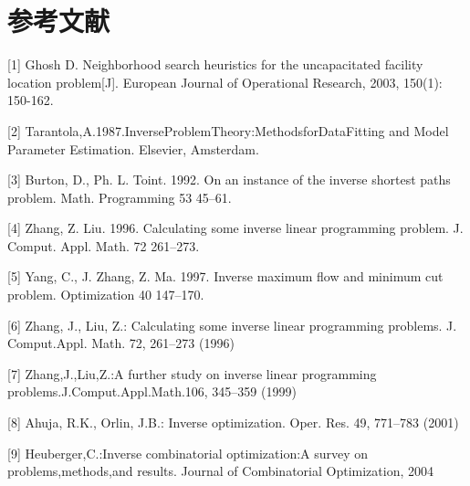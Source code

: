 \documentclass[UTF8]{article}
\begin{document}

\section*{参考文献}

[1] Ghosh D. Neighborhood search heuristics for the uncapacitated facility location problem[J]. European Journal of Operational Research, 2003, 150(1): 150-162.

[2] Tarantola,A.1987.InverseProblemTheory:MethodsforDataFitting and Model Parameter Estimation. Elsevier, Amsterdam.

[3] Burton, D., Ph. L. Toint. 1992. On an instance of the inverse shortest paths problem. Math. Programming 53 45–61.

[4] Zhang, Z. Liu. 1996. Calculating some inverse linear programming problem. J. Comput. Appl. Math. 72 261–273.

[5] Yang, C., J. Zhang, Z. Ma. 1997. Inverse maximum ﬂow and minimum cut problem. Optimization 40 147–170.

[6] Zhang, J., Liu, Z.: Calculating some inverse linear programming problems. J. Comput.Appl. Math. 72, 261–273 (1996)

[7] Zhang,J.,Liu,Z.:A further study on inverse linear programming problems.J.Comput.Appl.Math.106, 345–359 (1999)

[8] Ahuja, R.K., Orlin, J.B.: Inverse optimization. Oper. Res. 49, 771–783 (2001)

[9] Heuberger,C.:Inverse combinatorial optimization:A survey on problems,methods,and results. Journal of Combinatorial Optimization, 2004
\end{document}
